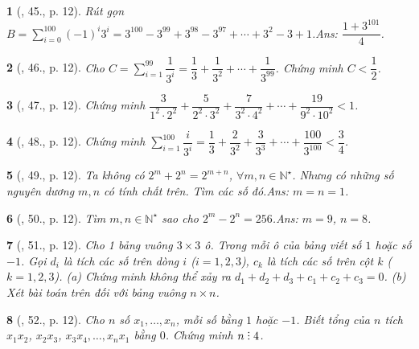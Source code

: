 \documentclass{article}
\newtheorem{baitoan}{}
\DeclareRobustCommand{\divby}{%
	\mathrel{\vbox{\baselineskip.65ex\lineskiplimit0pt\hbox{.}\hbox{.}\hbox{.}}}%
}
\begin{document}
\begin{baitoan}[\cite{Binh_Toan_7_tap_1}, 45., p. 12]
	Rút gọn $B = \sum_{i=0}^{100} (-1)^i3^i = 3^{100} - 3^{99} + 3^{98} - 3^{97} + \cdots + 3^2 - 3 + 1$.\hfill{\sf Ans: $\dfrac{1 + 3^{101}}{4}$.}
\end{baitoan}

\begin{baitoan}[\cite{Binh_Toan_7_tap_1}, 46., p. 12]
	Cho $C = \sum_{i=1}^{99} \dfrac{1}{3^i} = \dfrac{1}{3} + \dfrac{1}{3^2} + \cdots + \dfrac{1}{3^{99}}$. Chứng minh $C < \dfrac{1}{2}$.
\end{baitoan}

\begin{baitoan}[\cite{Binh_Toan_7_tap_1}, 47., p. 12]
	Chứng minh $\dfrac{3}{1^2\cdot 2^2} + \dfrac{5}{2^2\cdot 3^2} + \dfrac{7}{3^2\cdot 4^2} + \cdots + \dfrac{19}{9^2\cdot 10^2} < 1$.
\end{baitoan}

\begin{baitoan}[\cite{Binh_Toan_7_tap_1}, 48., p. 12]
	Chứng minh $\sum_{i=1}^{100} \dfrac{i}{3^i} = \dfrac{1}{3} + \dfrac{2}{3^2} + \dfrac{3}{3^3} + \cdots + \dfrac{100}{3^{100}} < \dfrac{3}{4}$.
\end{baitoan}

\begin{baitoan}[\cite{Binh_Toan_7_tap_1}, 49., p. 12]
	Ta không có $2^m + 2^n = 2^{m+n}$, $\forall m,n\in\mathbb{N}^\star$. Nhưng có những số nguyên dương $m,n$ có tính chất trên. Tìm các số đó.\hfill{\sf Ans: $m = n = 1$.}
\end{baitoan}

\begin{baitoan}[\cite{Binh_Toan_7_tap_1}, 50., p. 12]
	Tìm $m,n\in\mathbb{N}^\star$ sao cho $2^m - 2^n = 256$.\hfill{\sf Ans: $m = 9$, $n = 8$.}
\end{baitoan}

\begin{baitoan}[\cite{Binh_Toan_7_tap_1}, 51., p. 12]
	Cho 1 bảng vuông $3\times 3$ ô. Trong mỗi ô của bảng viết số $1$ hoặc số $-1$. Gọi $d_i$ là tích các số trên dòng $i$ ($i = 1,2,3$), $c_k$ là tích các số trên cột $k$ ($k = 1,2,3$). (a) Chứng minh không thể xảy ra $d_1 + d_2 + d_3 + c_1 + c_2 + c_3 = 0$. (b) Xét bài toán trên đối với bảng vuông $n\times n$.	
\end{baitoan}

\begin{baitoan}[\cite{Binh_Toan_7_tap_1}, 52., p. 12]
	Cho $n$ số $x_1,\ldots,x_n$, mỗi số bằng $1$ hoặc $-1$. Biết tổng của $n$ tích $x_1x_2$, $x_2x_3$, $x_3x_4,\ldots,x_nx_1$ bằng $0$. Chứng minh $n\divby4$.
\end{baitoan}
\end{document}
